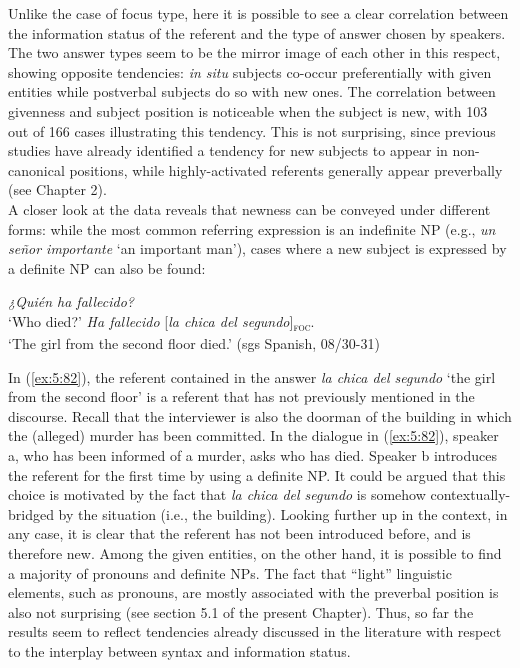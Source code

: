 Unlike the case of focus type, here it is possible to see a clear correlation between the information status of the referent and the type of answer chosen by speakers. The two answer types seem to be the mirror image of each other in this respect, showing opposite tendencies: \textit{in situ} subjects co-occur preferentially with given entities while postverbal subjects do so with new ones. 
The correlation between givenness and subject position is noticeable when the subject is new, with 103 out of 166 cases illustrating this tendency. This is not surprising, since previous studies have already identified a tendency for new subjects to appear in non-canonical positions, while highly-activated referents generally appear preverbally (see Chapter 2). \\
A closer look at the data reveals that newness can be conveyed under different forms: while the most common referring expression is an indefinite NP (e.g., \textit{un señor importante} `an important man'), cases where a new subject is expressed by a definite NP can also be found:

\ea \label{ex:5:82}
\ea \textit{¿Quién ha fallecido?}\\
 ‘Who died?'
\ex  \textit{Ha fallecido} {[\textit{la chica del segundo}]\textsubscript{\textsc{foc}}}\normalsize.\\
‘The girl from the second floor died.' \hfill (sgs Spanish, 08/30-31)     
\z \z


In (\ref{ex:5:82}), the referent contained in the answer \textit{la chica del segundo} `the girl from the second floor' is a referent that has not previously mentioned in the discourse. Recall that the interviewer is also the doorman of the building in which the (alleged) murder has been committed. In the dialogue in (\ref{ex:5:82}), speaker a, who has been informed of a murder, asks who has died. Speaker b introduces the referent for the first time by using a definite NP. It could be argued that this choice is motivated by the fact that \textit{la chica del segundo} is somehow contextually-bridged by the situation (i.e., the building). Looking further up in the context, in any case, it is clear that the referent has not been introduced before, and is therefore new.
Among the given entities, on the other hand, it is possible to find a majority of pronouns and definite NPs. The fact that ``light” linguistic elements, such as pronouns, are mostly associated with the preverbal position is also not surprising (see section 5.1 of the present Chapter). Thus, so far the results seem to reflect tendencies already discussed in the literature with respect to the interplay between syntax and information status.


